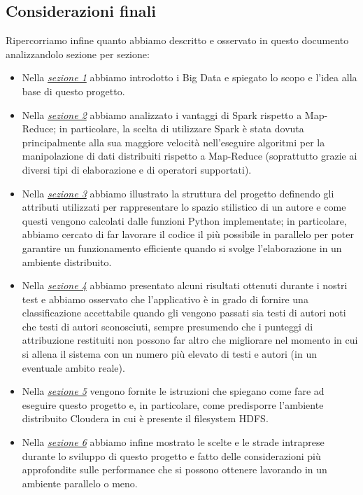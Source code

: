 \documentclass[titlepage]{article}
\begin{document}
\subsection{Considerazioni finali}
Ripercorriamo infine quanto abbiamo descritto e osservato in questo documento analizzandolo sezione per sezione:
\begin{itemize}
    \item Nella \hyperref[sec:1]{\textit{sezione 1}} abbiamo introdotto i Big Data e spiegato lo scopo e l'idea alla base di questo progetto.
    \item Nella \hyperref[sec:2]{\textit{sezione 2}} abbiamo analizzato i vantaggi di Spark rispetto a Map-Reduce; in particolare, la scelta di utilizzare Spark è stata dovuta principalmente alla sua maggiore velocità nell'eseguire algoritmi per la manipolazione di dati distribuiti rispetto a Map-Reduce (soprattutto grazie ai diversi tipi di elaborazione e di operatori supportati).
    \item Nella \hyperref[sec:3]{\textit{sezione 3}} abbiamo illustrato la struttura del progetto definendo gli attributi utilizzati per rappresentare lo spazio stilistico di un autore e come questi vengono calcolati dalle funzioni Python implementate; in particolare, abbiamo cercato di far lavorare il codice il più possibile in parallelo per poter garantire un funzionamento efficiente quando si svolge l'elaborazione in un ambiente distribuito.
    \item Nella \hyperref[sec:4]{\textit{sezione 4}} abbiamo presentato alcuni risultati ottenuti durante i nostri test e abbiamo osservato che l'applicativo è in grado di fornire una classificazione accettabile quando gli vengono passati sia testi di autori noti che testi di autori sconosciuti, sempre presumendo che i punteggi di attribuzione restituiti non possono far altro che migliorare nel momento in cui si allena il sistema con un numero più elevato di testi e autori (in un eventuale ambito reale).
    \item Nella \hyperref[sec:5]{\textit{sezione 5}} vengono fornite le istruzioni che spiegano come fare ad eseguire questo progetto e, in particolare, come predisporre l'ambiente distribuito Cloudera in cui è presente il filesystem HDFS.
    \item Nella \hyperref[sec:6]{\textit{sezione 6}} abbiamo infine mostrato le scelte e le strade intraprese durante lo sviluppo di questo progetto e fatto delle considerazioni più approfondite sulle performance che si possono ottenere lavorando in un ambiente parallelo o meno.
\end{itemize}
\end{document}

